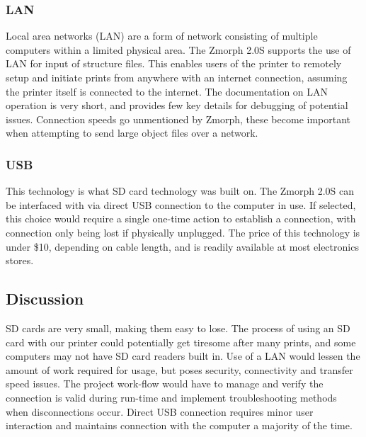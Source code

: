 \documentclass[letterpaper, onecolumn, draftclsnofoot, 10pt, compsoc]{IEEEtran}
\begin{document}
                \subsubsection{LAN}
                        \begin{singlespace}
                        Local area networks (LAN) are a form of network consisting of multiple computers within a limited physical area.
                        The Zmorph 2.0S supports the use of LAN for input of structure files.
                        This enables users of the printer to remotely setup and initiate prints from anywhere with an internet connection, assuming the printer itself is connected to the internet\cite{network}.
                        The documentation on LAN operation is very short, and provides few key details for debugging of potential issues.
                        Connection speeds go unmentioned by Zmorph, these become important when attempting to send large object files over a network.
                        \end{singlespace}
                \subsubsection{USB}
                        \begin{singlespace}
                        This technology is what SD card technology was built on.
                        The Zmorph 2.0S can be interfaced with via direct USB connection to the computer in use.
                        If selected, this choice would require a single one-time action to establish a connection, with connection only being lost if physically unplugged.
						The price of this technology is under \$10, depending on cable length, and is readily available at most electronics stores.
                        \end{singlespace}
        \subsection{Discussion}
                \begin{singlespace}
                SD cards are very small, making them easy to lose.
                The process of using an SD card with our printer could potentially get tiresome after many prints, and some computers may not have SD card readers built in.
                Use of a LAN would lessen the amount of work required for usage, but poses security, connectivity and transfer speed issues. 
                The project work-flow would have to manage and verify the connection is valid during run-time and implement troubleshooting methods when disconnections occur.
                Direct USB connection requires minor user interaction and maintains connection with the computer a majority of the time. 
                \end{singlespace}
\end{document}
